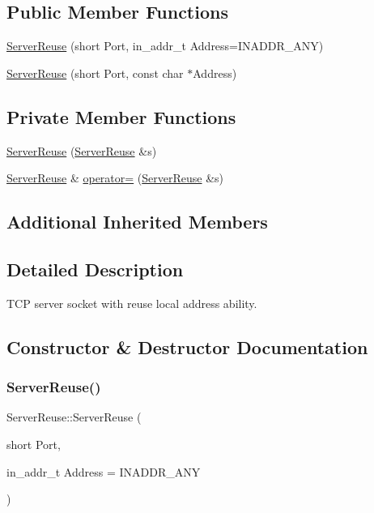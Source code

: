\subsection*{Public Member Functions}
\begin{DoxyCompactItemize}
\item 
\hyperlink{classServerReuse_ae875f0fb571e6df62a25b7371963e7bc}{Server\+Reuse} (short Port, in\+\_\+addr\+\_\+t Address=I\+N\+A\+D\+D\+R\+\_\+\+A\+NY)
\item 
\hyperlink{classServerReuse_abc7ad7021b9e7498488aeaca9712f378}{Server\+Reuse} (short Port, const char $\ast$Address)
\end{DoxyCompactItemize}
\subsection*{Private Member Functions}
\begin{DoxyCompactItemize}
\item 
\hyperlink{classServerReuse_af4d5bfd763f0411e025d86d5422abc74}{Server\+Reuse} (\hyperlink{classServerReuse}{Server\+Reuse} \&s)
\item 
\hyperlink{classServerReuse}{Server\+Reuse} \& \hyperlink{classServerReuse_a268c677f0e334f75d0d2151ab58b0131}{operator=} (\hyperlink{classServerReuse}{Server\+Reuse} \&s)
\end{DoxyCompactItemize}
\subsection*{Additional Inherited Members}


\subsection{Detailed Description}
T\+CP server socket with reuse local address ability. 

\subsection{Constructor \& Destructor Documentation}
\mbox{\label{classServerReuse_ae875f0fb571e6df62a25b7371963e7bc}} 
\subsubsection{\texorpdfstring{Server\+Reuse()}{ServerReuse()}\hspace{0.1cm}{\footnotesize\ttfamily [1/3]}}
{\footnotesize\ttfamily Server\+Reuse\+::\+Server\+Reuse (\begin{DoxyParamCaption}\item[{short}]{Port,  }\item[{in\+\_\+addr\+\_\+t}]{Address = {\ttfamily INADDR\+\_\+ANY} }\end{DoxyParamCaption})}

